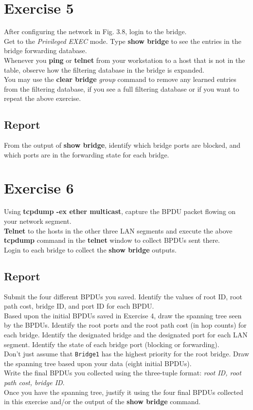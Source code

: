 \documentclass[10pt,a4paper]{article}
\numberwithin{equation}{section}
\numberwithin{figure}{section}
\numberwithin{table}{section}
\begin{document}
    \section{ Exercise 5}
    After configuring the network in Fig. 3.8, login to the bridge. \\
    Get to the \textit{Privileged EXEC} mode. Type \textbf{show bridge} to see the entries in the bridge forwarding database. \\
    Whenever you \textbf{ping} or \textbf{telnet} from your workstation to a host that is not in the table, observe how the filtering database in the bridge is expanded. \\
    You may use the \textbf{clear bridge} \textit{group} command to remove any learned entries from the filtering database, if you see a full filtering database or if you want to repeat the above exercise. \\
    \subsection*{Report}
    From the output of \textbf{show bridge}, identify which bridge ports are blocked, and which ports are in the forwarding state for each bridge.

    \section{ Exercise 6}
    Using \textbf{tcpdump -ex ether multicast}, capture the BPDU packet flowing on your network segment. \\
    \textbf{Telnet} to the hosts in the other three LAN segments and execute the above \textbf{tcpdump} command in the \textbf{telnet} window to collect BPDUs sent there. \\
    Login to each bridge to collect the \textbf{show bridge} outputs.
    \subsection*{Report}
    Submit the four different BPDUs you saved.
    Identify the values of root ID, root path cost, bridge ID, and port ID for each BPDU. \\
    Based upon the initial BPDUs saved in Exercise 4, draw the spanning tree seen by the BPDUs. Identify the root ports and the root path cost (in hop counts) for each bridge.
    Identify the designated bridge and the designated port for each LAN segment.
    Identify the state of each bridge port (blocking or forwarding). \\
    Don’t just assume that \texttt{Bridge1} has the highest priority for the root bridge.
    Draw the spanning tree based upon your data (eight initial BPDUs). \\
    Write the final BPDUs you collected using the three-tuple format: \textit{{root ID, root path cost, bridge ID}}. \\
    Once you have the spanning tree, justify it using the four final BPDUs collected in this exercise and/or the output of the \textbf{show bridge} command. \\
\end{document}
